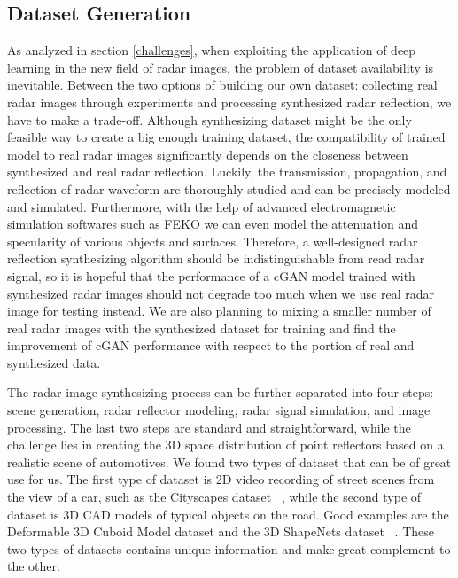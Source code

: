 \subsection{Dataset Generation}
As analyzed in section \ref{challenges}, when exploiting the application of deep learning in the new field of radar images, the problem of dataset availability is inevitable. Between the two options of building our own dataset: collecting real radar images through experiments and processing synthesized radar reflection, we have to make a trade-off. Although synthesizing dataset might be the only feasible way to create a big enough training dataset, the compatibility of trained model to real radar images significantly depends on the closeness between synthesized  and real radar reflection. Luckily, the transmission, propagation, and reflection of radar waveform are thoroughly studied and can be precisely modeled and simulated. Furthermore, with the help of advanced electromagnetic simulation softwares such as FEKO we can even model the attenuation and specularity of various objects and surfaces. Therefore, a well-designed radar reflection synthesizing algorithm should be indistinguishable from read radar signal, so it is hopeful that the performance of a cGAN model trained with synthesized radar images should not degrade too much when we use real radar image for testing instead. We are also planning to mixing a smaller number of real radar images with the synthesized dataset for training and find the improvement of cGAN performance with respect to the portion of real and synthesized data.  

The radar image synthesizing process can be further separated into four steps: scene generation, radar reflector modeling, radar signal simulation, and image processing. The last two steps are standard and straightforward, while the challenge lies in creating the 3D space distribution of point reflectors based on a realistic scene of automotives. We found two types of dataset that can be of great use for us. The first type of dataset is 2D video recording of street scenes from the view of a car, such as the Cityscapes dataset ~\cite{cityscapes}, while the second type of dataset is 3D CAD models of typical objects on the road. Good examples are the Deformable 3D Cuboid Model dataset and the 3D ShapeNets dataset ~\cite{3Ddata, shapenets}. These two types of datasets contains unique information and make great complement to the other.

